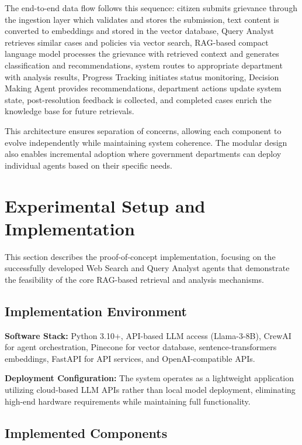 \documentclass[conference]{IEEEtran}
\begin{document}
The end-to-end data flow follows this sequence: citizen submits grievance through the ingestion layer which validates and stores the submission, text content is converted to embeddings and stored in the vector database, Query Analyst retrieves similar cases and policies via vector search, RAG-based compact language model processes the grievance with retrieved context and generates classification and recommendations, system routes to appropriate department with analysis results, Progress Tracking initiates status monitoring, Decision Making Agent provides recommendations, department actions update system state, post-resolution feedback is collected, and completed cases enrich the knowledge base for future retrievals.

This architecture ensures separation of concerns, allowing each component to evolve independently while maintaining system coherence. The modular design also enables incremental adoption where government departments can deploy individual agents based on their specific needs.

\section{Experimental Setup and Implementation}

This section describes the proof-of-concept implementation, focusing on the successfully developed Web Search and Query Analyst agents that demonstrate the feasibility of the core RAG-based retrieval and analysis mechanisms.

\subsection{Implementation Environment}

\textbf{Software Stack:}
Python 3.10+, API-based LLM access (Llama-3-8B), CrewAI for agent orchestration, Pinecone for vector database, sentence-transformers embeddings, FastAPI for API services, and OpenAI-compatible APIs.

\textbf{Deployment Configuration:}
The system operates as a lightweight application utilizing cloud-based LLM APIs rather than local model deployment, eliminating high-end hardware requirements while maintaining full functionality.

\subsection{Implemented Components}
\end{document}

